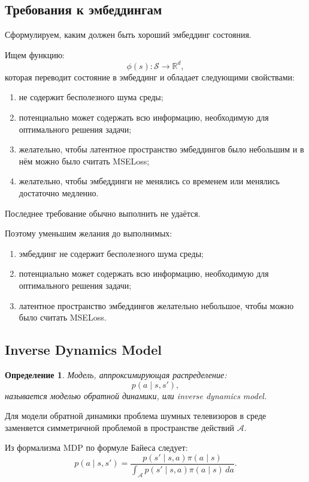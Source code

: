 \documentclass[12pt,a4paper]{article}
\newtheorem{definition}{Определение}
\begin{document}
\subsection{Требования к эмбеддингам}

Сформулируем, каким должен быть хороший эмбеддинг состояния.

Ищем функцию:
\[
\phi(s):\mathcal S\to\mathbb R^d,
\]
которая переводит состояние в эмбеддинг и обладает следующими свойствами:

\begin{enumerate}
    \item не содержит бесполезного шума среды;
    \item потенциально может содержать всю информацию, необходимую для оптимального решения задачи;
    \item желательно, чтобы латентное пространство эмбеддингов было небольшим и в нём можно было считать MSELoss;
    \item желательно, чтобы эмбеддинги не менялись со временем или менялись достаточно медленно.
\end{enumerate}

Последнее требование обычно выполнить не удаётся.

Поэтому уменьшим желания до выполнимых:

\begin{enumerate}
    \item эмбеддинг не содержит бесполезного шума среды;
    \item потенциально может содержать всю информацию, необходимую для оптимального решения задачи;
    \item латентное пространство эмбеддингов желательно небольшое, чтобы можно было считать MSELoss.
\end{enumerate}

\subsection{Inverse Dynamics Model}

\begin{definition}
Модель, аппроксимирующая распределение:
\[
p(a\mid s,s'),
\]
называется моделью обратной динамики, или inverse dynamics model.
\end{definition}

Для модели обратной динамики проблема шумных телевизоров в среде заменяется симметричной проблемой в пространстве действий $\mathcal A$.

Из формализма MDP по формуле Байеса следует:
\[
p(a\mid s,s')
=
\frac{
p(s'\mid s,a)\pi(a\mid s)
}{
\int_{\mathcal A}
p(s'\mid s,a)\pi(a\mid s)\,da
}.
\]
\end{document}
